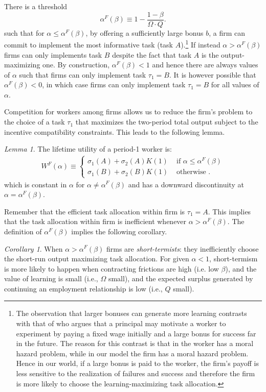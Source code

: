\documentclass[12pt,american]{paper}
\theoremstyle{remark}
\newtheorem{lemma}{Lemma}
\newtheorem{cor}{Corollary}
\begin{document}
There is a threshold
\[
\alpha^F(\beta) \equiv 1- \frac{1-\beta}{\Omega \cdot Q}.
\]
such that for $\alpha \leq \alpha^F(\beta)$, by offering a sufficiently large bonus $b$,  a firm can commit to  implement the most informative task (task $A$).\footnote{ The observation that larger bonuses can generate more learning contrasts with that of \citet{manso2011motivating} who argues that a principal may motivate a worker to experiment by paying a fixed wage initially and a large bonus for success far in the future. The reason for this contrast is that in \cite{manso2011motivating} the worker has a moral hazard problem, while in our model the firm has a moral hazard problem. Hence in our world, if a large bonus is paid to the worker, the firm's payoff is less sensitive to the realization of failures and success and therefore the firm is more likely to choose the learning-maximizing task allocation.} If instead  $\alpha > \alpha^F(\beta)$  firms can only implements task $B$ despite the fact that task $A$ is the output-maximizing one. By construction, $\alpha^F(\beta) <1$ and hence there are always values of $\alpha$ such that firms can only implement task $\tau_1=B$. It is however possible that $\alpha^F(\beta) <0$, in which case firms can only implement task $\tau_1=B$ for all values of $\alpha$.

Competition for workers among firms allows us to reduce the firm's problem to the choice of a task $\tau_1$ that maximizes the two-period total output subject to the incentive compatibility constraints. This leads to the following lemma.
\begin{lemma}
The lifetime utility of a period-1 worker is:
\begin{align}\label{eq: value worker}
W^F(\alpha) \equiv
\begin{cases}
\sigma_1(A)+\sigma_2(A) K(1) &\text{ if } \alpha \leq \alpha^F(\beta)\\
\sigma_1(B)+\sigma_2(B) K(1) &\text{ otherwise }.
\end{cases}
\end{align}
which is constant in $\alpha$ for $\alpha \neq \alpha^F(\beta)$ and has a downward discontinuity at $\alpha=\alpha^F(\beta)$.
\end{lemma}

Remember that the efficient task allocation within firm is $\tau_1=A$. This implies that the task allocation within firm is inefficient whenever  $\alpha>\alpha^F(\beta)$. The definition of $\alpha^F(\beta)$ implies the following corollary.
\begin{cor}
When $\alpha > \alpha^F(\beta)$ firms are \textit{short-termists}: they inefficiently choose the short-run output maximizing task allocation. For given $\alpha<1$, short-termism is more likely  to happen when  contracting frictions are high (i.e. low $\beta$),   and the value of learning   is small (i.e., $\Omega$ small), and the expected surplus generated by continuing an employment relationship is low (i.e., $Q$ small). 
\end{cor}
\end{document}
